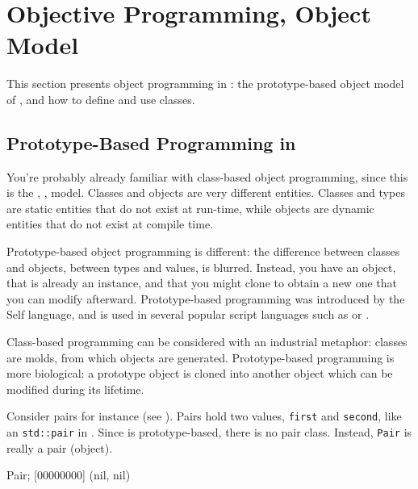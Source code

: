 
\chapter{Objective Programming, \us Object Model}
\label{sec:tut:object}

This section presents object programming in \us: the prototype-based
object model of \us, and how to define and use classes.

\section{Prototype-Based Programming in \us}

You're probably already familiar with class-based object programming, since
this is the \Cxx, \Java, \Cs model.  Classes and objects are very different
entities.  Classes and types are static entities that do not exist at
run-time, while objects are dynamic entities that do not exist at compile
time.

Prototype-based object programming is different: the difference between
classes and objects, between types and values, is blurred. Instead, you have
an object, that is already an instance, and that you might clone to obtain a
new one that you can modify afterward.  Prototype-based programming was
introduced by the Self language, and is used in several popular script
languages such as \Io or \Js.

Class-based programming can be considered with an industrial metaphor:
classes are molds, from which objects are generated.  Prototype-based
programming is more biological: a prototype object is cloned into another
object which can be modified during its lifetime.

Consider pairs for instance (see ). Pairs hold two values,
\lstinline|first| and \lstinline|second|, like an \lstinline{std::pair} in
\Cxx. Since \us is prototype-based, there is no pair class. Instead,
\lstinline|Pair| is really a pair (object).

\begin{urbiscript}[firstnumber=1]
Pair;
[00000000] (nil, nil)
\end{urbiscript}

